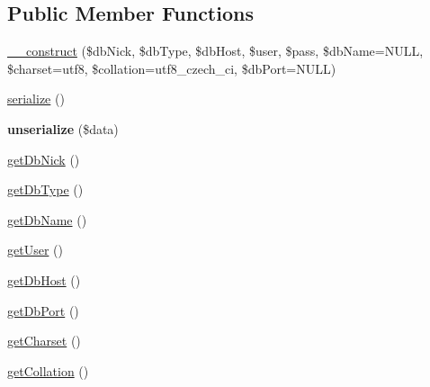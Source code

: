 \subsection*{Public Member Functions}
\begin{DoxyCompactItemize}
\item 
\mbox{\hyperlink{class_pes_1_1_database_1_1_handler_1_1_connection_info_a781e3c770ff984c6c0163cc88652351b}{\+\_\+\+\_\+construct}} (\$db\+Nick, \$db\+Type, \$db\+Host, \$user, \$pass, \$db\+Name=N\+U\+LL, \$charset=\textquotesingle{}utf8\textquotesingle{}, \$collation=\textquotesingle{}utf8\+\_\+czech\+\_\+ci\textquotesingle{}, \$db\+Port=N\+U\+LL)
\item 
\mbox{\hyperlink{class_pes_1_1_database_1_1_handler_1_1_connection_info_a4d9813fea8525b19a1d370eeb8fe41d6}{serialize}} ()
\item 
\mbox{\label{class_pes_1_1_database_1_1_handler_1_1_connection_info_a91b3cb8a65e42152cacf1cf222bd26f6}} 
{\bfseries unserialize} (\$data)
\item 
\mbox{\hyperlink{class_pes_1_1_database_1_1_handler_1_1_connection_info_a05c8fadf9d084bd94acc30760baae90f}{get\+Db\+Nick}} ()
\item 
\mbox{\hyperlink{class_pes_1_1_database_1_1_handler_1_1_connection_info_a36e6adfcbef4d922b36b8c6cea954c5c}{get\+Db\+Type}} ()
\item 
\mbox{\hyperlink{class_pes_1_1_database_1_1_handler_1_1_connection_info_a4949c3e4d80c0d275c80e0c1c3b5b280}{get\+Db\+Name}} ()
\item 
\mbox{\hyperlink{class_pes_1_1_database_1_1_handler_1_1_connection_info_ae81b7186fb97a7c6457edcc68c9aa2ef}{get\+User}} ()
\item 
\mbox{\hyperlink{class_pes_1_1_database_1_1_handler_1_1_connection_info_ad855d2dfa322f4566b89fcc00fd0e282}{get\+Db\+Host}} ()
\item 
\mbox{\hyperlink{class_pes_1_1_database_1_1_handler_1_1_connection_info_add0a7153055b0ebf4d84b7a235fee1c7}{get\+Db\+Port}} ()
\item 
\mbox{\hyperlink{class_pes_1_1_database_1_1_handler_1_1_connection_info_abca2d528da8311b6fcfe040768cbaa24}{get\+Charset}} ()
\item 
\mbox{\hyperlink{class_pes_1_1_database_1_1_handler_1_1_connection_info_a8a2e3a5e3b3b7a164c858bcfdd49ac71}{get\+Collation}} ()
\end{DoxyCompactItemize}


